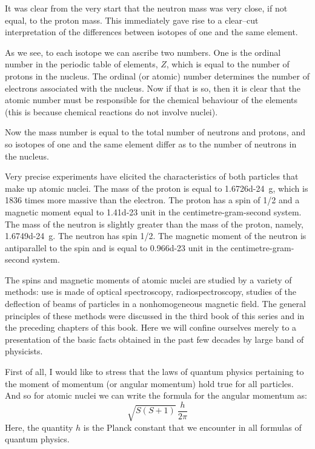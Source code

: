 It was clear from the very start that the neutron mass was very close, if not equal, to the proton mass. This immediately gave rise to a clear--cut interpretation of the differences between isotopes of one and the same element.

As we see, to each isotope we can ascribe two numbers. One is the ordinal number in the periodic table of ele­ments, $Z$, which is equal to the number of protons in the nucleus. The ordinal (or atomic) number determines the number of electrons associated with the nucleus. Now if that is so, then it is clear that the atomic number must be responsible for the chemical behaviour of the elements (this is because chemical reactions do not involve nuclei).

Now the mass number is equal to the total number of neutrons and protons, and so isotopes of one and the same element differ as to the number of neutrons in the nucleus.

Very precise experiments have elicited the character­istics of both particles that make up atomic nuclei. The mass of the proton is equal to \SI{1.6726d-24}{\gram}, which is 1836 times more massive than the electron. The proton has a spin of 1/2 and a magnetic moment equal to \num{1.41d-23} unit in the centimetre-gram-second system. The mass of the neutron is slightly greater than the mass of the proton, namely, \SI{1.6749d-24}{\gram}. The neutron has spin 1/2. The magnetic moment of the neutron is antipar­allel to the spin and is equal to \num{0.966d-23} unit in the centimetre-gram-second system.

The spins and magnetic moments of atomic nuclei are studied by a variety of methods: use is made of optical spectroscopy, radiospectroscopy, studies of the deflection of beams of particles in a nonhomogeneous magnetic field. The general principles of these methods were discussed in the third book of this series and in the preceding chapters of this book. Here we will confine ourselves merely to a presentation of the basic facts obtained in the past few decades by large band of physicists.

First of all, I would like to stress that the laws of quantum physics pertaining to the moment of momentum (or angular momentum) hold true for all particles. And so for atomic nuclei we can write the formula for the angular momentum as:
\begin{equation*}%
\sqrt{S(S+ 1)}\,\frac{h}{2 \pi}
\end{equation*}
Here, the quantity $h$ is the Planck constant that we encounter in all formulas of quantum physics.

